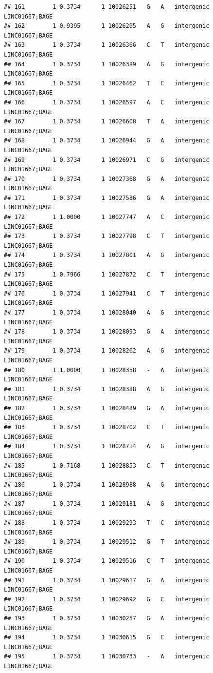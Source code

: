 \documentclass[
]{article}
\begin{document}
\begin{verbatim}
## 161        1 0.3734      1 10026251   G   A   intergenic LINC01667;BAGE
## 162        1 0.9395      1 10026295   A   G   intergenic LINC01667;BAGE
## 163        1 0.3734      1 10026366   C   T   intergenic LINC01667;BAGE
## 164        1 0.3734      1 10026389   A   G   intergenic LINC01667;BAGE
## 165        1 0.3734      1 10026462   T   C   intergenic LINC01667;BAGE
## 166        1 0.3734      1 10026597   A   C   intergenic LINC01667;BAGE
## 167        1 0.3734      1 10026608   T   A   intergenic LINC01667;BAGE
## 168        1 0.3734      1 10026944   G   A   intergenic LINC01667;BAGE
## 169        1 0.3734      1 10026971   C   G   intergenic LINC01667;BAGE
## 170        1 0.3734      1 10027368   G   A   intergenic LINC01667;BAGE
## 171        1 0.3734      1 10027586   G   A   intergenic LINC01667;BAGE
## 172        1 1.0000      1 10027747   A   C   intergenic LINC01667;BAGE
## 173        1 0.3734      1 10027798   C   T   intergenic LINC01667;BAGE
## 174        1 0.3734      1 10027801   A   G   intergenic LINC01667;BAGE
## 175        1 0.7966      1 10027872   C   T   intergenic LINC01667;BAGE
## 176        1 0.3734      1 10027941   C   T   intergenic LINC01667;BAGE
## 177        1 0.3734      1 10028040   A   G   intergenic LINC01667;BAGE
## 178        1 0.3734      1 10028093   G   A   intergenic LINC01667;BAGE
## 179        1 0.3734      1 10028262   A   G   intergenic LINC01667;BAGE
## 180        1 1.0000      1 10028358   -   A   intergenic LINC01667;BAGE
## 181        1 0.3734      1 10028388   A   G   intergenic LINC01667;BAGE
## 182        1 0.3734      1 10028489   G   A   intergenic LINC01667;BAGE
## 183        1 0.3734      1 10028702   C   T   intergenic LINC01667;BAGE
## 184        1 0.3734      1 10028714   A   G   intergenic LINC01667;BAGE
## 185        1 0.7168      1 10028853   C   T   intergenic LINC01667;BAGE
## 186        1 0.3734      1 10028988   A   G   intergenic LINC01667;BAGE
## 187        1 0.3734      1 10029181   A   G   intergenic LINC01667;BAGE
## 188        1 0.3734      1 10029293   T   C   intergenic LINC01667;BAGE
## 189        1 0.3734      1 10029512   G   T   intergenic LINC01667;BAGE
## 190        1 0.3734      1 10029516   C   T   intergenic LINC01667;BAGE
## 191        1 0.3734      1 10029617   G   A   intergenic LINC01667;BAGE
## 192        1 0.3734      1 10029692   G   C   intergenic LINC01667;BAGE
## 193        1 0.3734      1 10030257   G   A   intergenic LINC01667;BAGE
## 194        1 0.3734      1 10030615   G   C   intergenic LINC01667;BAGE
## 195        1 0.3734      1 10030733   -   A   intergenic LINC01667;BAGE

\end{verbatim}
\end{document}
